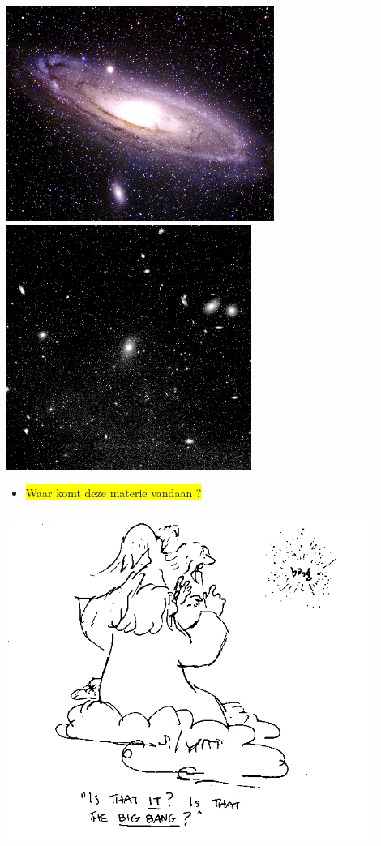 \begin{center}
\includegraphics[keepaspectratio,height=7cm]{m31}\\[3mm]
\includegraphics[keepaspectratio,height=8cm]{virgo}
\end{center}

\Tr
\vspace*{1mm}
\begin{itemize}
\item \colorbox{yellow}{Waar komt deze materie vandaan ?}
\end{itemize}
%
\vspace*{1cm}
\includegraphics[keepaspectratio,width=12cm]{bang}

